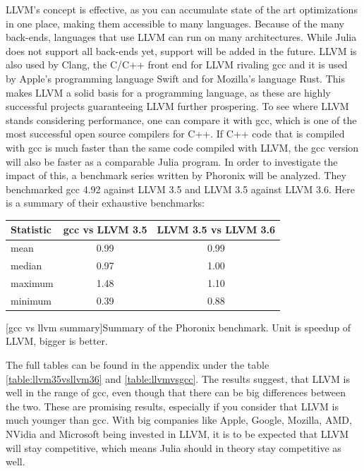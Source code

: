 \ac{LLVM}'s concept is effective, as you can accumulate state of the art optimizations in one place, making them accessible to many languages. Because of the many back-ends, languages that use \ac{LLVM} can run on many architectures. While Julia does not support all back-ends yet, support will be added in the future. 
\ac{LLVM} is also used by Clang, the C/C++ front end for \ac{LLVM} rivaling \ac{gcc} and it is used by Apple's programming language Swift and for Mozilla's language Rust.
This makes \ac{LLVM} a solid basis for a programming language, as these are highly successful projects guaranteeing \ac{LLVM} further prospering.
To see where \ac{LLVM} stands considering performance, one can compare it with \ac{gcc}, which is one of the most successful open source compilers for C++.
If C++ code that is compiled with \ac{gcc} is much faster than the same code compiled with \ac{LLVM}, the \ac{gcc} version will also be faster as a comparable Julia program.
In order to investigate the impact of this, a benchmark series written by Phoronix will be analyzed.
They benchmarked \ac{gcc} 4.92 against \ac{LLVM} 3.5 and \ac{LLVM} 3.5 against \ac{LLVM} 3.6.
Here is a summary of their exhaustive benchmarks:
\begin{table}[ht]
  \centering
  \begin{tabular}{l|c|c}
    \hline
    \textbf{Statistic} & \textbf{\ac{gcc} vs \ac{LLVM} 3.5} & \textbf{\ac{LLVM} 3.5 vs \ac{LLVM} 3.6} \\
    \hline
    mean & 0.99 & 0.99 \\
    median & 0.97 & 1.00 \\
    maximum & 1.48 & 1.10 \\
    minimum & 0.39 & 0.88 \\
    \hline
  \end{tabular}
    [gcc vs llvm summary]{Summary of the Phoronix benchmark. Unit is speedup of \ac{LLVM}, bigger is better. \cite{LLVM35vsLLVM36}\cite{LLVMvsGCC}\cite{Phoronix}}
    \label{table:gccvsllvm}
\end{table}

The full tables can be found in the appendix under the table \ref{table:llvm35vsllvm36} and \ref{table:llvmvsgcc}.
The results suggest, that \ac{LLVM} is well in the range of \ac{gcc}, even though that there can be big differences between the two.
These are promising results, especially if you consider that \ac{LLVM} is much younger than \ac{gcc}. 
With big companies like Apple\cite{GoogleAppleLLVM}, Google\cite{GoogleAppleLLVM}, Mozilla\cite{Rust}, AMD\cite{LLVMAMD}, NVidia\cite{LLVMNvidia} and Microsoft\cite{MicrosoftLLVM} being invested in LLVM, it is to be expected that \ac{LLVM} will stay competitive, which means Julia should in theory stay competitive as well.


